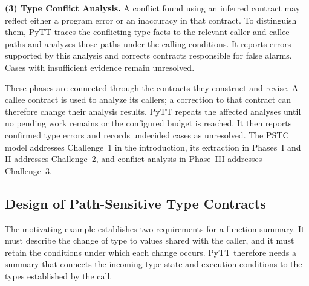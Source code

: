 \textbf{(3) Type Conflict Analysis.}
A conflict found using an inferred contract may reflect either a program
error or an inaccuracy in that contract. To distinguish them, PyTT traces
the conflicting type facts to the relevant caller and callee paths and
analyzes those paths under the calling conditions. It reports errors
supported by this analysis and corrects contracts responsible for false
alarms. Cases with insufficient evidence remain unresolved.

These phases are connected through the contracts they construct and
revise. A callee contract is used to analyze its callers; a correction to
that contract can therefore change their analysis results. PyTT repeats
the affected analyses until no pending work remains or the configured
budget is reached. It then reports confirmed type errors and records
undecided cases as unresolved. The PSTC model addresses Challenge~1 in
the introduction, its extraction in Phases~I and II addresses
Challenge~2, and conflict analysis in Phase~III addresses Challenge~3.

\subsection{Design of Path-Sensitive Type Contracts}
\label{sec:state-model}

The motivating example establishes two requirements for a function
summary. It must describe the change of type to values shared with the caller, and
it must retain the conditions under which each change occurs. 
PyTT therefore needs a summary that connects the incoming type-state and
execution conditions to the types established by the call.

